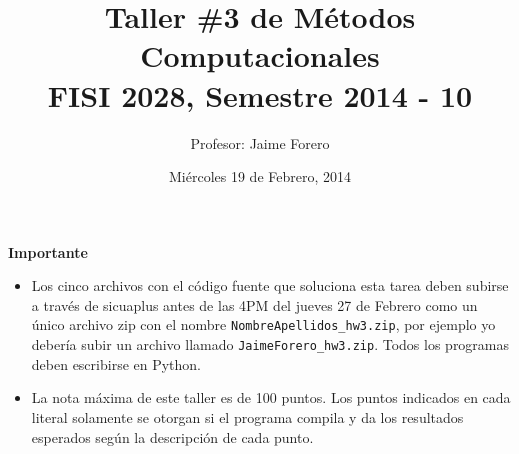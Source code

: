 \documentclass{article}
\title{Taller \#3 de M\'etodos Computacionales\\ FISI 2028, Semestre 2014 - 10}
\author{Profesor: Jaime Forero}
\date{Mi\'ercoles 19 de Febrero, 2014}
\begin{document}
\maketitle
\thispagestyle{empty}


{\bf Importante}
\begin{itemize}

\item Los cinco archivos con el c\'odigo fuente que soluciona esta
  tarea deben subirse a trav\'es de sicuaplus antes de las 4PM del
  jueves 27 de Febrero como un \'unico archivo zip con el nombre
  \verb"NombreApellidos_hw3.zip", por ejemplo yo deber\'ia subir un
  archivo llamado \verb"JaimeForero_hw3.zip". Todos los programas
  deben escribirse en Python.  

\item La nota m\'axima de este taller es de 100 puntos. Los puntos indicados
  en cada literal solamente se otorgan si el programa compila y da los
  resultados esperados seg\'un la descripci\'on de cada punto.
 
\end{itemize}
\end{document}
